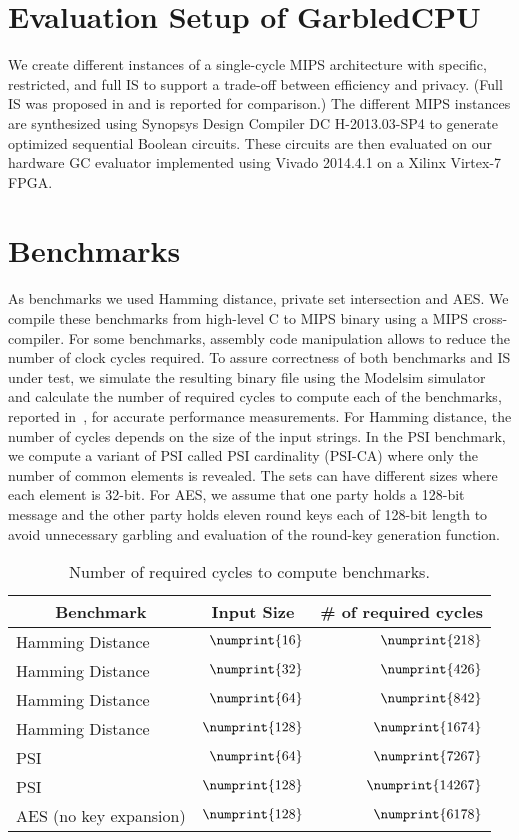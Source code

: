 \section{Evaluation Setup of GarbledCPU}\label{ssec:evalset}
We create different instances of a single-cycle MIPS architecture with specific, restricted, and full IS to support a trade-off between efficiency and privacy. (Full IS was proposed in \cite{songhori2015tinygarble} and is reported for comparison.) The different MIPS instances are synthesized using Synopsys Design Compiler DC H-2013.03-SP4 to generate optimized sequential Boolean circuits. These circuits are then evaluated on our hardware GC evaluator implemented using Vivado 2014.4.1 on a Xilinx Virtex-7 FPGA.

\section{Benchmarks}\label{ssec:bench}
As benchmarks we used Hamming distance, private set intersection and AES. We compile these benchmarks from high-level C to MIPS binary using a MIPS cross-compiler. For some benchmarks, assembly code manipulation allows to reduce the number of clock cycles required. To assure correctness of both benchmarks and IS under test, we simulate the resulting binary file using the Modelsim simulator and calculate the number of required cycles to compute each of the benchmarks, reported in~, for accurate performance measurements. For Hamming distance, the number of cycles depends on the size of the input strings. In the PSI benchmark, we compute a variant of PSI called PSI cardinality (PSI-CA) where only the number of common elements is revealed. The sets can have different sizes where each element is 32-bit.  For AES, we assume that one party holds a 128-bit message and the other party holds eleven round keys each of 128-bit length to avoid unnecessary garbling and evaluation of the round-key generation function.

\begin{table}[ht]
\caption{Number of required cycles to compute benchmarks.}\label{tab:cyc_bench}
\centering
\small
\begin{tabular}{l|r|r}
\multicolumn{1}{c|}{Benchmark} & \multicolumn{1}{c|}{Input Size} &  \multicolumn{1}{c}{\# of required cycles} \\
\hline
\hline
Hamming Distance & $\numprint{16}$ & $\numprint{218}$\\
\hline
 Hamming Distance & $\numprint{32}$ & $\numprint{426}$\\
\hline
Hamming Distance & $\numprint{64}$ & $\numprint{842}$\\
\hline
Hamming Distance & $\numprint{128}$ & $\numprint{1674}$\\
\hline
PSI & $\numprint{64}$ &$\numprint{7267}$\\
\hline
PSI & $\numprint{128}$ &$\numprint{14267}$\\
\hline
AES (no key expansion) & $\numprint{128}$ & $\numprint{6178}$\\
\end{tabular}
\end{table}

